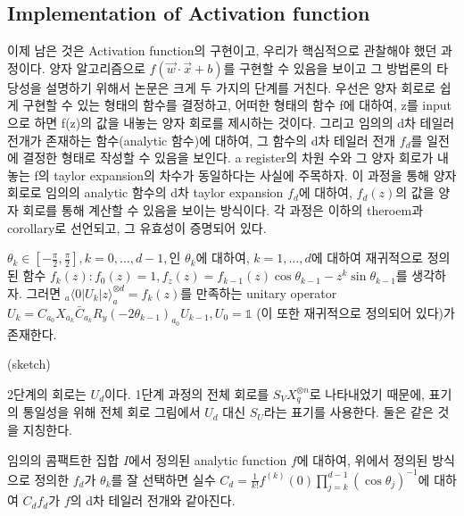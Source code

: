 \subsection{Implementation of Activation function}

이제 남은 것은 Activation function의 구현이고, 우리가 핵심적으로 관찰해야 했던 과정이다.
양자 알고리즘으로 \(f(\vec{w}\cdot\vec{x}+b)\)를 구현할 수 있음을 보이고 그 방법론의 타당성을 설명하기 위해서 논문은 크게 두 가지의 단계를 거친다.
우선은 양자 회로로 쉽게 구현할 수 있는 형태의 함수를 결정하고,
어떠한 형태의 함수 f에 대하여, z를 input으로 하면 f(z)의 값을 내놓는 양자 회로를 제시하는 것이다.
그리고 임의의 d차 테일러 전개가 존재하는 함수(analytic 함수)에 대하여, 그 함수의 d차 테일러 전개 \(f_d\)를 일전에 결정한 형태로 작성할 수 있음을 보인다.
a register의 차원 수와 그 양자 회로가 내놓는 f의 taylor expansion의 차수가 동일하다는 사실에 주목하자.
이 과정을 통해 양자 회로로 임의의 analytic 함수의 d차 taylor expansion \(f_d\)에 대하여, \(f_d(z)\)의 값을 양자 회로를 통해 계산할 수 있음을 보이는 방식이다.
각 과정은 이하의 theroem과 corollary로 선언되고, 그 유효성이 증명되어 있다.

\begin{theorem}
    \(\theta_{k} \in [-\frac{\pi}{2},\frac{\pi}{2}], k = 0,\dots,d-1,\)인 \(\theta_{k}\)에 대하여, \(k = 1,\dots,d\)에 대하여 재귀적으로 정의된 함수 \(f_k(z): f_0(z) = 1, f_z(z) = f_{k-1}(z)\cos\theta_{k-1} - z^k\sin\theta_{k-1}\)를 생각하자.
    그러면 \(_a \langle  0|U_k|z \rangle  _a^{\otimes d} = f_k(z)\)를 만족하는 unitary operator \(U_k = C_{a_0}X_{a_k}\bar{C}_{a_k}R_y(-2\theta_{k-1})_{a_0}U_{k-1}, U_0 = \mathbb{1} \) (이 또한 재귀적으로 정의되어 있다)가 존재한다.
\end{theorem}

\begin{pf}(sketch)
    
    2단계의 회로는 \(U_d\)이다. 1단계 과정의 전체 회로를 \(S_VX_q^{\otimes n}\)로 나타내었기 때문에, 표기의 통일성을 위해 전체 회로 그림에서 \(U_d\) 대신 \(S_U\)라는 표기를 사용한다. 둘은 같은 것을 지칭한다.
    

\end{pf}

\begin{corollary}
    임의의 콤팩트한 집합 \(I\)에서 정의된 analytic function \(f\)에 대하여, 위에서 정의된 방식으로 정의한 \(f_d\)가 \(\theta_k\)를 잘 선택하면 실수 \(C_d = \frac{1}{k!}f^{(k)}(0)\prod_{j=k}^{d-1}(\cos\theta_j)^{-1}\)에 대하여 \(C_df_d\)가 \(f\)의 d차 테일러 전개와 같아진다.
\end{corollary}

